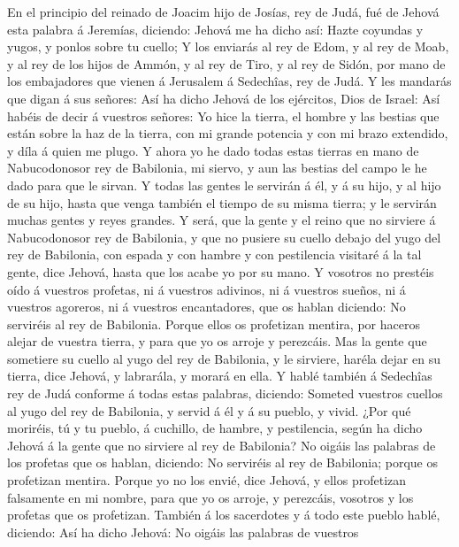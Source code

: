  En el principio del reinado de Joacim hijo de Josías, rey
de Judá, fué de Jehová esta palabra á Jeremías, diciendo: 
Jehová me ha dicho así: Hazte coyundas y yugos, y ponlos sobre tu
cuello;  Y los enviarás al rey de Edom, y al rey de Moab, y
al rey de los hijos de Ammón, y al rey de Tiro, y al rey de Sidón, por
mano de los embajadores que vienen á Jerusalem á Sedechîas, rey de Judá.
 Y les mandarás que digan á sus señores: Así ha dicho Jehová
de los ejércitos, Dios de Israel: Así habéis de decir á vuestros
señores:  Yo hice la tierra, el hombre y las bestias que
están sobre la haz de la tierra, con mi grande potencia y con mi brazo
extendido, y díla á quien me plugo.  Y ahora yo he dado
todas estas tierras en mano de Nabucodonosor rey de Babilonia, mi
siervo, y aun las bestias del campo le he dado para que le sirvan.
 Y todas las gentes le servirán á él, y á su hijo, y al hijo
de su hijo, hasta que venga también el tiempo de su misma tierra; y le
servirán muchas gentes y reyes grandes.  Y será, que la
gente y el reino que no sirviere á Nabucodonosor rey de Babilonia, y que
no pusiere su cuello debajo del yugo del rey de Babilonia, con espada y
con hambre y con pestilencia visitaré á la tal gente, dice Jehová, hasta
que los acabe yo por su mano.  Y vosotros no prestéis oído á
vuestros profetas, ni á vuestros adivinos, ni á vuestros sueños, ni á
vuestros agoreros, ni á vuestros encantadores, que os hablan diciendo:
No serviréis al rey de Babilonia.  Porque ellos os
profetizan mentira, por haceros alejar de vuestra tierra, y para que yo
os arroje y perezcáis.  Mas la gente que sometiere su
cuello al yugo del rey de Babilonia, y le sirviere, haréla dejar en su
tierra, dice Jehová, y labrarála, y morará en ella.  Y
hablé también á Sedechîas rey de Judá conforme á todas estas palabras,
diciendo: Someted vuestros cuellos al yugo del rey de Babilonia, y
servid á él y á su pueblo, y vivid.  ¿Por qué moriréis, tú
y tu pueblo, á cuchillo, de hambre, y pestilencia, según ha dicho Jehová
á la gente que no sirviere al rey de Babilonia?  No oigáis
las palabras de los profetas que os hablan, diciendo: No serviréis al
rey de Babilonia; porque os profetizan mentira.  Porque yo
no los envié, dice Jehová, y ellos profetizan falsamente en mi nombre,
para que yo os arroje, y perezcáis, vosotros y los profetas que os
profetizan.  También á los sacerdotes y á todo este pueblo
hablé, diciendo: Así ha dicho Jehová: No oigáis las palabras de vuestros
